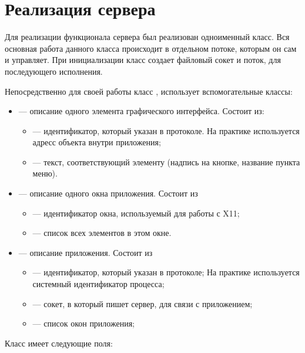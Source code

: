 \section{Реализация сервера}

Для реализации функционала сервера был реализован одноименный класс. Вся
основная работа данного класса происходит в отдельном потоке, которым он сам и
управляет. При инициализации класс создает файловый сокет и поток, для
последующего исполнения.

Непосредственно для своей работы класс , использует вспомогательные
классы:
\begin{itemize}
    \item {} — описание одного элемента графического интерфейса.
        Состоит из:
        \begin{itemize}
            \item {} — идентификатор, который указан в протоколе. На
                практике используется адресс объекта внутри приложения;
            \item {} — текст, соответствующий элементу (надпись на
                кнопке, название пункта меню).
        \end{itemize}

    \item {} — описание одного окна приложения. Состоит из
        \begin{itemize}
        \item {} — идентификатор окна, используемый для работы с X11;
        \item {} — список всех элементов в этом окне.
        \end{itemize}

    \item {} — описание приложения. Состоит из
        \begin{itemize}
        \item {} — идентификатор, который указан в протоколе; На
            практике используется системный идентификатор процесса;
        \item {} — сокет, в который пишет сервер, для связи с
            приложением;
        \item {} — список окон приложения;
        \end{itemize}
\end{itemize}

Класс  имеет следующие поля:

